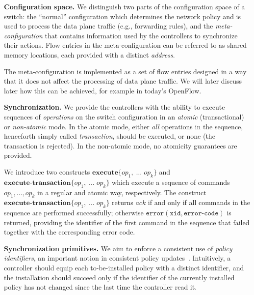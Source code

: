 \documentclass[conference]{sigcomm-alternate}
\newcommand{\petr}[1]{\textit{\textcolor{blue}{[petr]: #1}}} %
\newcommand{\error}{\texttt{error}}
\newcommand{\xid}{\texttt{xid}}
\newcommand{\ecode}{\texttt{error-code}}
\newcommand{\exec}{\textbf{execute}}
\newcommand{\execatomic}{\textbf{execute-transaction}}
\newcommand{\ack}{\textit{ack}}
\begin{document}
\vspace{1mm}
\noindent\textbf{Configuration space.}
%
We distinguish two parts of the configuration space of a switch:
the ``normal'' configuration which determines the network policy and
is used to process the data plane traffic (e.g., forwarding rules),
and the \emph{meta-configuration} that contains information used by the
controllers to synchronize their actions.
Flow entries in the meta-configuration can be referred to as shared
memory locations, each provided with a distinct \emph{address}.

The meta-configuration is implemented as a set of flow entries
designed in a way that it does not affect the processing of data plane
traffic. 
We will later discuss later how this can be achieved, for example in 
today's OpenFlow.



\vspace{1mm}
\noindent\textbf{Synchronization.}
We provide the controllers with the ability to execute
sequences of \emph{operations} on the
switch configuration in an \emph{atomic} (transactional) or \emph{non-atomic} mode.
In the atomic mode, either \emph{all} operations in the sequence, henceforth simply
called \emph{transaction},
should be executed, or none (the transaction is rejected).
In the non-atomic mode, no atomicity guarantees are provided.

We introduce two constructs
$\exec\{op_1,\;\ldots\;op_k\}$ and $\execatomic\{op_1,\;\ldots\;op_k\}$
which execute a sequence of commands $op_1,\ldots,op_k$ in
a regular and atomic way, respectively.
The construct $\execatomic\{op_1,\;\ldots\;op_k\}$  
returns $\ack$ if and only if all commands in the sequence are performed successfully; otherwise
$\error(\xid,\ecode)$ is returned, providing
the identifier of the first command in the sequence that failed
together with the corresponding error code.


\vspace{1mm}
\noindent\textbf{Synchronization primitives.}
%
We aim to enforce a consistent use of  \emph{policy identifiers},
an important notion in consistent policy updates~\cite{network-update,stn}.
Intuitively, a controller should
equip each to-be-installed policy with a distinct
identifier,
and the installation should succeed only if the identifier of the
currently installed policy has not changed since the last time the
controller read it.
\end{document}
